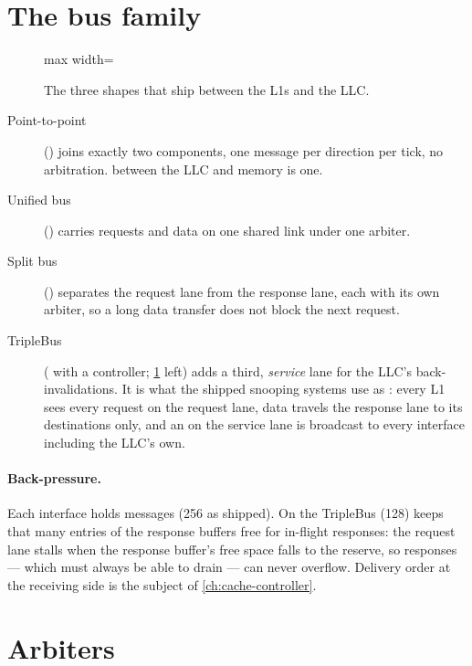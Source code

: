 \section{The bus family}

\begin{figure}[htbp]\centering
\begin{adjustbox}{max width=\textwidth}\end{adjustbox}
\caption{The three shapes that ship between the L1s and the LLC.}
\label{fig:topologies}
\end{figure}

\begin{description}
\item[Point-to-point] () joins exactly two components, one message
  per direction per tick, no arbitration.  between the LLC and memory is one.
\item[Unified bus] () carries requests and data on one shared link
  under one arbiter.
\item[Split bus] () separates the request lane from the response lane,
  each with its own arbiter, so a long data transfer does not block the next request.
\item[TripleBus] ( with a  controller; \cref{fig:topologies} left)
  adds a third, \emph{service} lane for the LLC's back-invalidations. It is what the shipped
  snooping systems use as : every L1 sees every request on the request lane, data
  travels the response lane to its destinations only, and an  on the service lane is
  broadcast to every interface including the LLC's own.
\end{description}

\paragraph{Back-pressure.} Each interface holds  messages (256 as
shipped). On the TripleBus  (128) keeps that many entries of the response
buffers free for in-flight responses: the request lane stalls when the response buffer's free
space falls to the reserve, so responses --- which must always be able to drain --- can never
overflow. Delivery order at the receiving side is the subject of \cref{ch:cache-controller}.

\section{Arbiters}\label{sec:arbiters}

